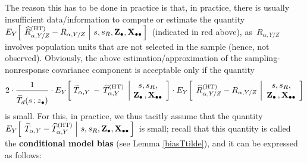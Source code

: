 \begin{itemize}
\begin{itemize}
\begin{equation*}
        \end{equation*}
        The reason this has to be done in practice is that, in practice,
        there is usually insufficient data/information to compute or estimate
        the quantity
        \,$
        E_{Y}\!\left[\;
            \left.
            \widehat{R}^{\textnormal{(HT)}}_{\alpha,Y/Z} - R_{\alpha,Y/Z}
            \;\right\vert\,
            s,s_{R},\mathbf{Z}_{\bullet},\mathbf{X}_{\bullet\bullet}
            \,\right]
        $\,
        (indicated in red above), as \,$R_{\alpha,Y/Z}$\, involves population units
        that are not selected in the sample (hence, not observed).
        \vskip 0.1cm
        \noindent
        Obviously, the above estimation/approximation
        of the sampling-nonresponse covariance component
        is acceptable only if the quantity
        \begin{equation*}
        2
        \cdot
        \dfrac{
            1
            }{
            \overset{{\color{white}.}}{
                \widehat{T}_{d}(s\,;\zdot)
                }
            }
        \cdot
        E_{Y}\!\left[\;
            \widetilde{T}_{\alpha,Y}
            \, - \,
            \widehat{T}^{\textnormal{(HT)}}_{\alpha,Y}
            \;\left\vert\!
            \begin{array}{c}
                s,s_{R},
                \\
                \Zdot\,,\Xobs
                \end{array}
            \right.
            \!\right]
        \cdot
        {\color{black}E_{Y}\!\left[\;\,
            \widehat{R}^{\textnormal{(HT)}}_{\alpha,Y/Z} - R_{\alpha,Y/Z}
            \,\left\vert
            \begin{array}{c}
                s,s_{R},
                \\
                \Zdot\,,\Xobs
                \end{array}
            \right.
            \!\right]}
        \end{equation*}
        is small.
        \vskip 0.1cm
        \noindent
        For this, in practice, we thus {\color{red}tacitly assume} that the quantity
        \,$
        E_{Y}\!\left[\;
            \left.
            \widetilde{T}_{\alpha,Y} \overset{{\color{white}.}}{-} \widehat{T}^{\textnormal{(HT)}}_{\alpha,Y}
            \;\right\vert\,
            s,s_{R},\Zdot,\Xobs
            \,\right]
        $\,
        is small;
        recall that this quantity is called the \textbf{conditional model bias}
        (see Lemma \ref{biasTtilde}), and
        it can be expressed as follows:

\end{itemize}
\end{itemize}
